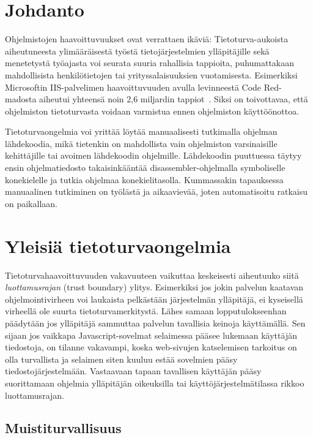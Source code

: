 \section{Johdanto}

Ohjelmistojen haavoittuvuukset ovat verrattaen ikäviä:
Tietoturva-aukoista aiheutuneesta ylimääräisestä työstä tietojärjestelmien ylläpitäjille
sekä menetetystä työajasta voi seurata suuria rahallisia tappioita,
puhumattakaan mahdollisista henkilötietojen tai yrityssalaisuuksien vuotamisesta.
Esimerkiksi Microsoftin IIS-palvelimen haavoittuvuuden avulla levinneestä Code Red-madosta
aiheutui yhteensä noin 2,6 miljardin tappiot~\cite{CodeRed}.
Siksi on toivottavaa, että ohjelmiston tietoturvasta voidaan varmistua ennen ohjelmiston käyttöönottoa.

Tietoturvaongelmia voi yrittää löytää manuaalisesti tutkimalla ohjelman lähdekoodia,
mikä tietenkin on mahdollista vain ohjelmiston varsinaisille kehittäjille
tai avoimen lähdekoodin ohjelmille.
Lähdekoodin puuttuessa täytyy ensin ohjelmatiedosto takaisinkääntää
disassembler-ohjelmalla symboliselle konekielelle
ja tutkia ohjelmaa konekielitasolla.
Kummassakin tapauksessa manuaalinen tutkiminen on työlästä ja aikaavievää, joten automatisoitu ratkaisu on paikallaan.

\section{Yleisiä tietoturvaongelmia}

Tietoturvahaavoittuvuuden vakavuuteen vaikuttaa keskeisesti aiheutuuko siitä \emph{luottamusrajan}
(trust boundary) ylitys.
Esimerkiksi jos jokin palvelun kaatavan ohjelmointivirheen voi laukaista pelkästään järjestelmän
ylläpitäjä, ei kyseisellä virheellä ole suurta tietoturvamerkitystä.
Lähes samaan lopputulokseenhan päädytään jos ylläpitäjä sammuttaa palvelun tavallisia keinoja käyttämällä.
Sen sijaan jos vaikkapa Javascript-sovelmat selaimessa pääsee lukemaan käyttäjän tiedostoja,
on tilanne vakavampi, koska web-sivujen katselemisen tarkoitus on olla turvallista ja selaimen siten
kuuluu estää sovelmien pääsy tiedostojärjestelmään.
Vastaavaan tapaan tavallisen käyttäjän pääsy suorittamaan ohjelmia ylläpitäjän oikeuksilla
tai käyttöjärjestelmätilassa rikkoo luottamusrajan.

\subsection{Muistiturvallisuus}


